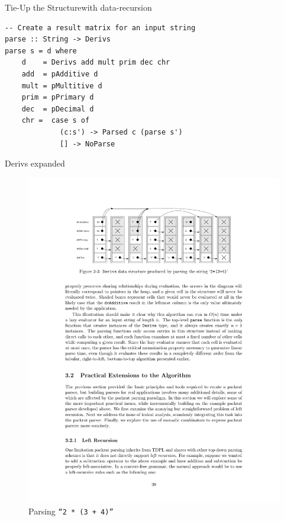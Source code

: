 \documentclass{beamer}
\begin{document}
\begin{frame}[fragile]{Tie-Up the Structure}{with data-recursion}
\begin{verbatim}
-- Create a result matrix for an input string
parse :: String -> Derivs
parse s = d where
    d    = Derivs add mult prim dec chr 
    add  = pAdditive d
    mult = pMultitive d
    prim = pPrimary d
    dec  = pDecimal d 
    chr =  case s of
             (c:s') -> Parsed c (parse s') 
             [] -> NoParse
\end{verbatim}
\end{frame}

\begin{frame}{Derivs expanded}
\begin{figure}
\includegraphics[width=\textwidth]{memotable.pdf}
\caption{Parsing \texttt{``2 * (3 + 4)''}}
\end{figure}
\end{frame}
\end{document}

